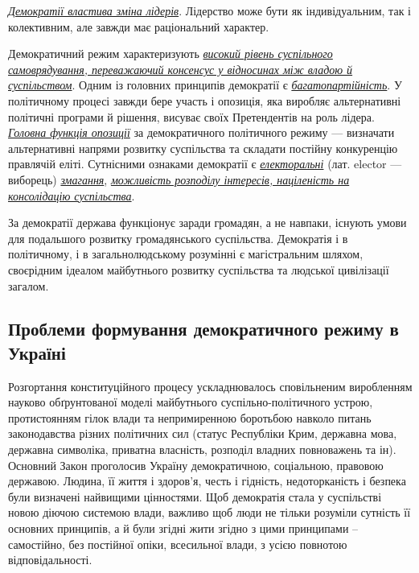 \ul{\textit{Демократії властива зміна лідерів}}. Лідерство може бути як індивідуальним, так і колективним, але завжди має раціональний характер.

Демократичний режим характеризують \ul{\textit{високий рівень суспільного самоврядування, переважаючий консенсус у відносинах між владою й суспільством}}. Одним із головних принципів демократії є \ul{\textit{багатопартійність}}. У політичному процесі завжди бере участь і опозиція, яка виробляє альтернативні політичні програми й рішення, висуває своїх Претендентів на роль лідера. \ul{\textit{Головна функція опозиції}} за демократичного політичного режиму — визначати альтернативні напрями розвитку суспільства та складати постійну конкуренцію правлячій еліті. Сутнісними ознаками демократії є \ul{\textit{електоральні}} (лат. elector — виборець) \ul{\textit{змагання}}, \ul{\textit{можливість розподілу інтересів, націленість на консолідацію суспільства}}.

За демократії держава функціонує заради громадян, а не навпаки, існують умови для подальшого розвитку громадянського суспільства. Демократія і в політичному, і в загальнолюдському розумінні є магістральним шляхом, своєрідним ідеалом майбутнього розвитку суспільства та людської цивілізації загалом.
\subsection{Проблеми формування демократичного режиму в Україні}
Розгортання конституційного процесу ускладнювалось сповільненим виробленням науково обґрунтованої моделі майбутнього суспільно-політичного устрою, протистоянням гілок влади та непримиренною боротьбою навколо питань законодавства різних політичних сил (статус Республіки Крим, державна мова, державна символіка, приватна власність, розподіл владних повноважень та ін).
Основний Закон проголосив Україну демократичною, соціальною, правовою державою. Людина, її життя і здоров'я, честь і гідність, недоторканість і безпека були визначені найвищими цінностями.
Щоб демократія стала у суспільстві новою діючою системою влади, важливо щоб люди не тільки розуміли сутність її основних принципів, а й були згідні жити згідно з цими принципами – самостійно, без постійної опіки, всесильної влади, з усією повнотою відповідальності.

